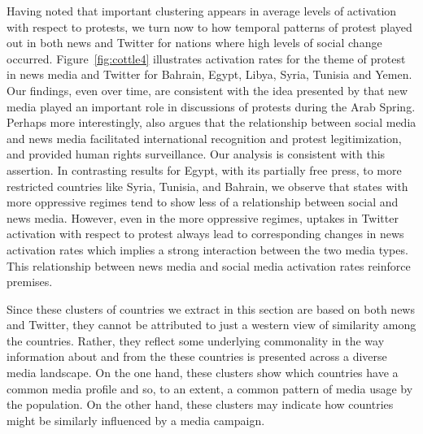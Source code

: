 Having noted that important clustering appears in average levels of activation with respect to protests, we turn now to how temporal patterns of protest played out in both news and Twitter for nations where high levels of social change occurred. Figure~\ref{fig:cottle4} illustrates activation rates for the theme of protest in news media and Twitter for Bahrain, Egypt, Libya, Syria, Tunisia and Yemen. Our findings, even over time, are consistent with the idea presented by \cite{cottle_media_2011} that new media played an important role in discussions of protests during the Arab Spring.  Perhaps more interestingly, \cite{cottle_media_2011} also argues that the relationship between social media and news media facilitated international recognition and protest legitimization, and provided human rights surveillance.  Our analysis is consistent with this assertion.  In contrasting results for Egypt, with its partially free press, to more restricted countries like Syria, Tunisia, and Bahrain, we observe that states with more oppressive regimes tend to show less of a relationship between social and news media. However, even in the more oppressive regimes, uptakes in Twitter activation with respect to protest always lead to corresponding changes in news activation rates which implies a strong interaction between the two media types. This relationship between news media and social media activation rates reinforce  premises. 

Since these clusters of countries we extract in this section are based on both news and Twitter, they cannot be attributed to just a western view of similarity among the countries.  Rather, they reflect some underlying commonality in the way information about and from the these countries is presented across a diverse media landscape.  On the one hand, these clusters show which countries have a common media profile and so, to an extent, a common pattern of media usage by the population.  On the other hand, these clusters may indicate how countries might be similarly influenced by a media campaign.  


